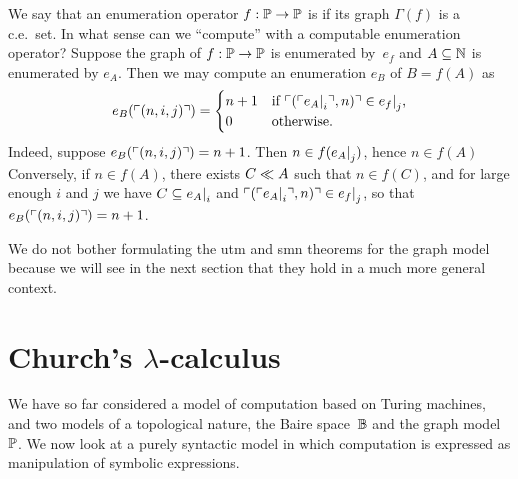We say that an enumeration operator $f : \mathbb{P} \to \mathbb{P}$ is
 if its graph $\Gamma(f)$ is a c.e.~set. In what
sense can we ``compute'' with a computable enumeration operator?
Suppose the graph of $f : \mathbb{P} \to \mathbb{P}$ is enumerated by~$e_f$
and $A \subseteq \mathbb{N}$ is enumerated by $e_A$. Then we may compute an
enumeration $e_B$ of $B = f(A)$ as
%
\begin{equation*}
  e_B(\ulcorner (n, i, j) \urcorner) =
  \begin{cases}
    n + 1 & \text{if $\ulcorner (\ulcorner e_A{\mid}_{i} \urcorner, n) \urcorner \in
      e_f{\mid}_{j}$,}\\
    0 & \text{otherwise}.
  \end{cases}
\end{equation*}
%
Indeed, suppose $e_B(\ulcorner (n,i,j) \urcorner) = n + 1$. Then $n \in
f(e_A{\mid}_{j})$, hence $n \in f(A)$ Conversely, if $n \in
f(A)$, there exists $C \ll A$ such that $n \in f(C)$, and for large
enough $i$ and $j$ we have $C \subseteq e_A{\mid}_{i}$ and
$\ulcorner (\ulcorner e_A{\mid}_{i} \urcorner, n) \urcorner \in e_f{\mid}_{j}$, so
that $e_B(\ulcorner (n, i, j) \urcorner) = n + 1$.

We do not bother formulating the utm and smn theorems for the graph
model because we will see in the next section that they hold in a much
more general context.

\section[\texorpdfstring%
{Church's $\lambda$-calculus}%
{Church's lambda-calculus}%
]{Church's $\lambda$-calculus}
\label{sec:churchs-calculus}

We have so far considered a model of computation based on Turing
machines, and two models of a topological nature, the Baire
space~$\mathbb{B}$ and the graph model~$\mathbb{P}$. We now look at a purely
syntactic model in which computation is expressed as manipulation of
symbolic expressions.


